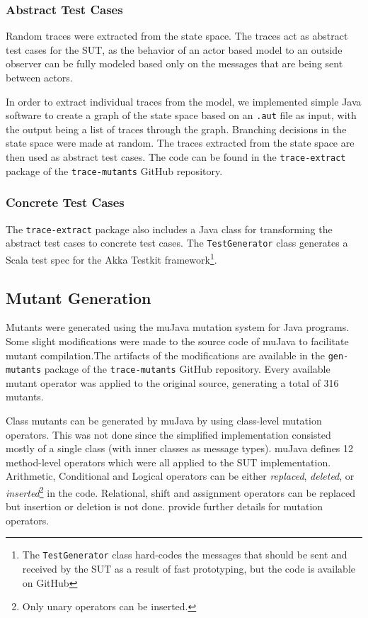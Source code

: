 \documentclass{article}
\begin{document}
			\subsubsection{Abstract Test Cases}
				\label{sec:method_abstract}
				Random traces were extracted from the state space. The traces act as abstract test cases for the SUT, as the behavior of an actor based model to an outside observer can be fully modeled based only on the messages that are being sent between actors.

				In order to extract individual traces from the \Rebeca model, we implemented simple Java software to create a graph of the state space based on an \texttt{.aut} file as input, with the output being a list of traces through the graph. Branching decisions in the state space were made at random. The traces extracted from the state space are then used as abstract test cases.
				The code can be found in the \texttt{trace-extract} package of the \texttt{trace-mutants} GitHub repository. \nocite{trace-mutants}

			\subsubsection{Concrete Test Cases}
				\label{sec:method_concrete}
				The \texttt{trace-extract} package also includes a Java class for transforming the abstract test cases to concrete test cases. The \texttt{TestGenerator} class generates a Scala test spec for the Akka Testkit framework\footnote{The \texttt{TestGenerator} class hard-codes the messages that should be sent and received by the SUT as a result of fast prototyping, but the code is available on GitHub}.

		\subsection{Mutant Generation}
			\label{sec:method_mutgen}
			Mutants were generated using the muJava \citet{mujava} mutation system for Java programs. Some slight modifications were made to the source code of muJava to facilitate mutant compilation.The artifacts of the modifications are available in the \texttt{gen-mutants} package of the \texttt{trace-mutants} GitHub repository. Every available mutant operator was applied to the original source, generating a total of 316 mutants.

			Class mutants can be generated by muJava by using class-level mutation operators. This was not done since the simplified implementation consisted mostly of a single class (with inner classes as message types). muJava defines 12 method-level operators which were all applied to the SUT implementation. Arithmetic, Conditional and Logical operators can be either \textit{replaced}, \textit{deleted}, or \textit{inserted}\footnote{Only unary operators can be inserted.} in the code. Relational, shift and assignment operators can be replaced but insertion or deletion is not done. \citet{mutopsMethod} provide further details for mutation operators.
\end{document}
